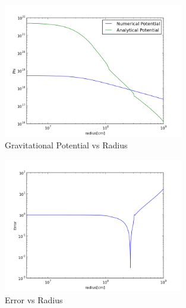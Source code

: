 \documentclass[11pt,letterpaper]{article}
\begin{document}
\begin{figure}[bth]
\centering
\includegraphics[width=0.7\textwidth]{ws12fig2.png}
\caption{Gravitational Potential vs Radius}
\label{fig:2}
\end{figure}


\begin{figure}[bth]
\centering
\includegraphics[width=0.7\textwidth]{ws12fig3.png}
\caption{Error vs Radius}
\label{fig:3}
\end{figure}
\end{document}
